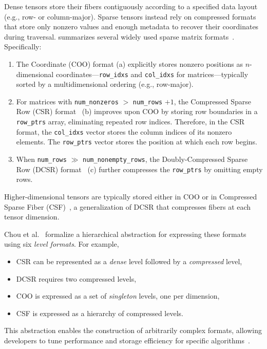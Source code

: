 Dense tensors store their fibers contiguously according to a specified data layout (e.g., row- or column-major). Sparse tensors instead rely on compressed formats that store only nonzero values and enough metadata to recover their coordinates during traversal.  summarizes several widely used sparse matrix formats~\cite{chou2018format}. Specifically:
\begin{enumerate}[label=(\alph*)]
    \item The Coordinate (COO) format (a) explicitly stores nonzero positions as $n$-dimensional coordinates---\texttt{row\_idxs} and \texttt{col\_idxs} for matrices---typically sorted by a multidimensional ordering (e.g., row-major).
    \item For matrices with \texttt{num\_nonzeros} $>$ \texttt{num\_rows} $+ 1$, the Compressed Sparse Row (CSR) format~\cite{barrett1994book} (b) improves upon COO by storing row boundaries in a \texttt{row\_ptrs} array, eliminating repeated row indices. Therefore, in the CSR format, the \texttt{col\_idxs} vector stores the column indices of its nonzero elements. The \texttt{row\_ptrs} vector stores the position at which each row begins.
    \item When \texttt{num\_rows} $\gg$ \texttt{num\_nonempty\_rows}, the Doubly-Compressed Sparse Row (DCSR) format~\cite{buluc2008representation} (c) further compresses the \texttt{row\_ptrs} by omitting empty rows.
\end{enumerate}
Higher-dimensional tensors are typically stored either in COO or in Compressed Sparse Fiber (CSF)~\cite{smith2015tensor}, a generalization of DCSR that compresses fibers at each tensor dimension.

Chou et al.~\cite{chou2018format} formalize a hierarchical abstraction for expressing these formats using six \textit{level formats}. For example,
\begin{itemize}
    \item CSR can be represented as a \textit{dense} level followed by a \textit{compressed} level,
    \item DCSR requires two compressed levels,
    \item COO is expressed as a set of \textit{singleton} levels, one per dimension,
    \item CSF is expressed as a hierarchy of compressed levels.
\end{itemize}
This abstraction enables the construction of arbitrarily complex formats, allowing developers to tune performance and storage efficiency for specific algorithms~\cite{kjolstad2017oopsla}.

